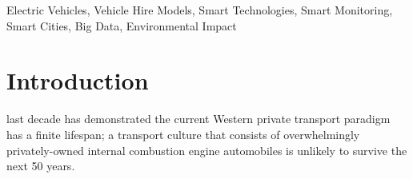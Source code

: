 \documentclass[journal]{IEEEtran}
\begin{document}
\begin{IEEEkeywords}
Electric Vehicles, Vehicle Hire Models, Smart Technologies, Smart 
Monitoring, Smart Cities, Big Data, Environmental Impact
\end{IEEEkeywords}


%



\section{Introduction}
% 
% 
% 
% 

 last decade has demonstrated the current Western
private transport paradigm has a finite lifespan; a transport culture
that consists of overwhelmingly privately-owned internal combustion
engine automobiles is unlikely to survive the next 50 years.
\end{document}
